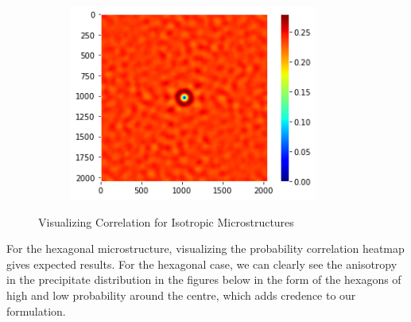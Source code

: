 \documentclass[12pt, a4paper]{report}
\begin{document}
\begin{figure}[H]
\begin{subfigure}{.32\textwidth}
  \includegraphics[width=0.9\textwidth]{Pictures/MSFeatures/CorrImageCross.png}
  \label{img:microstrImg}
\end{subfigure}
\caption{Visualizing Correlation for Isotropic Microstructures}
\label{fig:test}
\end{figure}

For the hexagonal microstructure, visualizing the probability correlation heatmap gives expected results. For the hexagonal case, we can clearly see the anisotropy in the precipitate distribution in the figures below in the form of the hexagons of high and low probability around the centre, which adds credence to our formulation. 
\end{document}
